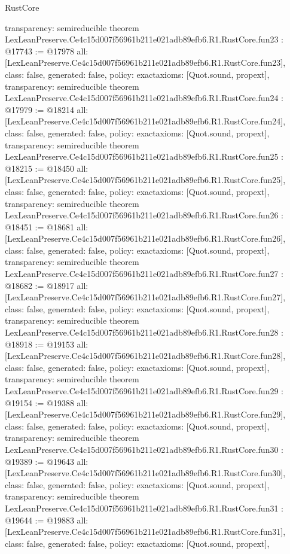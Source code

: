 \begin{lexlean}{RustCore}
\begin{coremodule}
{  transparency: semireducible
}
theorem LexLeanPreserve.Ce4c15d007f56961b211e021adb89efb6.R1.RustCore.fun23 : @17743 := @17978 {
  all: [LexLeanPreserve.Ce4c15d007f56961b211e021adb89efb6.R1.RustCore.fun23],
  class: false,
  generated: false,
  policy: exact{axioms: [Quot.sound, propext]},
  transparency: semireducible
}
theorem LexLeanPreserve.Ce4c15d007f56961b211e021adb89efb6.R1.RustCore.fun24 : @17979 := @18214 {
  all: [LexLeanPreserve.Ce4c15d007f56961b211e021adb89efb6.R1.RustCore.fun24],
  class: false,
  generated: false,
  policy: exact{axioms: [Quot.sound, propext]},
  transparency: semireducible
}
theorem LexLeanPreserve.Ce4c15d007f56961b211e021adb89efb6.R1.RustCore.fun25 : @18215 := @18450 {
  all: [LexLeanPreserve.Ce4c15d007f56961b211e021adb89efb6.R1.RustCore.fun25],
  class: false,
  generated: false,
  policy: exact{axioms: [Quot.sound, propext]},
  transparency: semireducible
}
theorem LexLeanPreserve.Ce4c15d007f56961b211e021adb89efb6.R1.RustCore.fun26 : @18451 := @18681 {
  all: [LexLeanPreserve.Ce4c15d007f56961b211e021adb89efb6.R1.RustCore.fun26],
  class: false,
  generated: false,
  policy: exact{axioms: [Quot.sound, propext]},
  transparency: semireducible
}
theorem LexLeanPreserve.Ce4c15d007f56961b211e021adb89efb6.R1.RustCore.fun27 : @18682 := @18917 {
  all: [LexLeanPreserve.Ce4c15d007f56961b211e021adb89efb6.R1.RustCore.fun27],
  class: false,
  generated: false,
  policy: exact{axioms: [Quot.sound, propext]},
  transparency: semireducible
}
theorem LexLeanPreserve.Ce4c15d007f56961b211e021adb89efb6.R1.RustCore.fun28 : @18918 := @19153 {
  all: [LexLeanPreserve.Ce4c15d007f56961b211e021adb89efb6.R1.RustCore.fun28],
  class: false,
  generated: false,
  policy: exact{axioms: [Quot.sound, propext]},
  transparency: semireducible
}
theorem LexLeanPreserve.Ce4c15d007f56961b211e021adb89efb6.R1.RustCore.fun29 : @19154 := @19388 {
  all: [LexLeanPreserve.Ce4c15d007f56961b211e021adb89efb6.R1.RustCore.fun29],
  class: false,
  generated: false,
  policy: exact{axioms: [Quot.sound, propext]},
  transparency: semireducible
}
theorem LexLeanPreserve.Ce4c15d007f56961b211e021adb89efb6.R1.RustCore.fun30 : @19389 := @19643 {
  all: [LexLeanPreserve.Ce4c15d007f56961b211e021adb89efb6.R1.RustCore.fun30],
  class: false,
  generated: false,
  policy: exact{axioms: [Quot.sound, propext]},
  transparency: semireducible
}
theorem LexLeanPreserve.Ce4c15d007f56961b211e021adb89efb6.R1.RustCore.fun31 : @19644 := @19883 {
  all: [LexLeanPreserve.Ce4c15d007f56961b211e021adb89efb6.R1.RustCore.fun31],
  class: false,
  generated: false,
  policy: exact{axioms: [Quot.sound, propext]},
}
\end{coremodule}
\end{lexlean}
